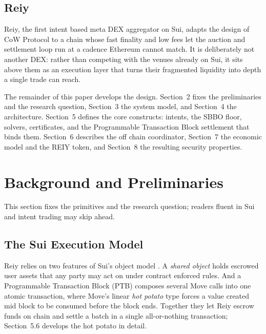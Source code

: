 \documentclass[10pt,sigconf,nonacm]{acmart}
\theoremstyle{reiythm}
\begin{document}
\subsection{Reiy}

Reiy, the first intent based meta DEX aggregator on Sui, adapts the design of CoW
Protocol \cite{documentationcowdaoe} to a chain whose fast finality and low fees
let the auction and settlement loop run at a cadence Ethereum cannot match. It is
deliberately not another DEX: rather than competing with the venues already on
Sui, it sits above them as an execution layer that turns their fragmented
liquidity into depth a single trade can reach.

The remainder of this paper develops the design. Section~2 fixes the preliminaries
and the research question, Section~3 the system model, and Section~4 the
architecture. Section~5 defines the core constructs: intents, the SBBO floor,
solvers, certificates, and the Programmable Transaction Block settlement that binds
them. Section~6 describes the off chain coordinator, Section~7 the economic model
and the REIY token, and Section~8 the resulting security properties.

\section{Background and Preliminaries}

This section fixes the primitives and the research question; readers fluent in Sui
and intent trading may skip ahead.

\subsection{The Sui Execution Model}

Reiy relies on two features of Sui's object model \cite{suidefistack}. A
\emph{shared object} holds escrowed user assets that any party may act on under
contract enforced rules. And a Programmable Transaction Block (PTB) composes several
Move calls into one atomic transaction, where Move's linear \emph{hot potato} type
forces a value created mid block to be consumed before the block ends. Together they
let Reiy escrow funds on chain and settle a batch in a single all-or-nothing
transaction; Section~5.6 develops the hot potato in detail.
\end{document}
